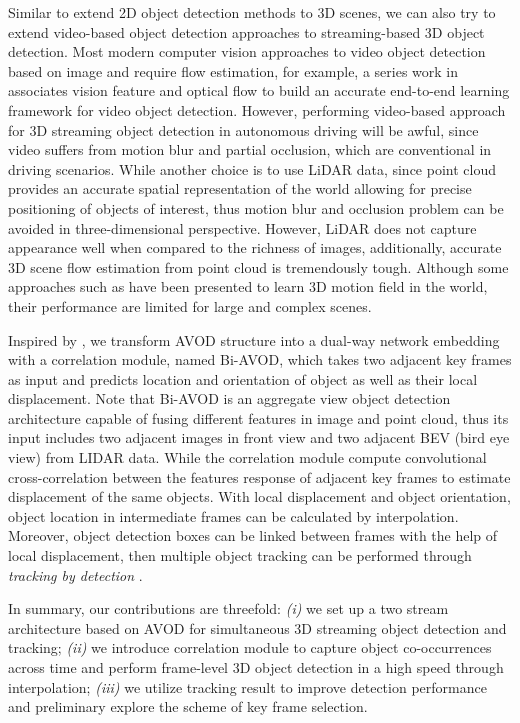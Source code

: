 \documentclass{bmvc2k}
\begin{document}
Similar to extend 2D object detection methods to 3D scenes, we can also try to extend video-based object detection approaches to streaming-based 3D object detection. Most modern computer vision approaches to video object detection based on image and require flow estimation, for example, a series work in \cite{zhu2017flow,zhu2018towards} associates vision feature and optical flow to build an accurate end-to-end learning framework for video object detection. However, performing video-based approach for 3D streaming object detection in autonomous driving will be awful, since video suffers from motion blur and partial occlusion, which are conventional in driving scenarios. While another choice is to use LiDAR data, since point cloud provides an accurate spatial representation of the world allowing for precise positioning of objects of interest, thus motion blur and occlusion problem can be avoided in three-dimensional perspective. However, LiDAR does not capture appearance well when compared to the richness of images, additionally, accurate 3D scene flow estimation from point cloud is tremendously tough. Although some approaches such as \cite{liu2018learning, behl2018pointflownet} have been presented to learn 3D motion field in the world, their performance are limited for large and complex scenes. 

Inspired by \cite{feichtenhofer2017detect}, we transform AVOD \cite{ku2018joint} structure into 
a dual-way network embedding with a correlation module, named Bi-AVOD, which takes two adjacent key frames as input and predicts location and orientation of object as well as their local displacement. Note that Bi-AVOD is an aggregate view object detection architecture capable of fusing different features in image and point cloud, thus its input includes two adjacent images in front view and two adjacent BEV (bird eye view) from LIDAR data. While the correlation module compute convolutional cross-correlation between the features response of adjacent key frames to estimate displacement of the same objects. With local displacement and object orientation, object location in intermediate frames can be calculated by interpolation. Moreover, object detection boxes can be linked between frames with the help of local displacement, then multiple object tracking can be performed through \textit{tracking by detection} \cite{lenz2015followme}. 

In summary, our contributions are threefold: \textit{(i)} we set up a two stream architecture based on AVOD for simultaneous 3D streaming object detection and tracking; \textit{(ii)} we introduce correlation module to capture object co-occurrences across time and perform frame-level 3D object detection in a high speed through interpolation; \textit{(iii)} we utilize tracking result to improve detection performance and preliminary explore the scheme of key frame selection. 
\end{document}
